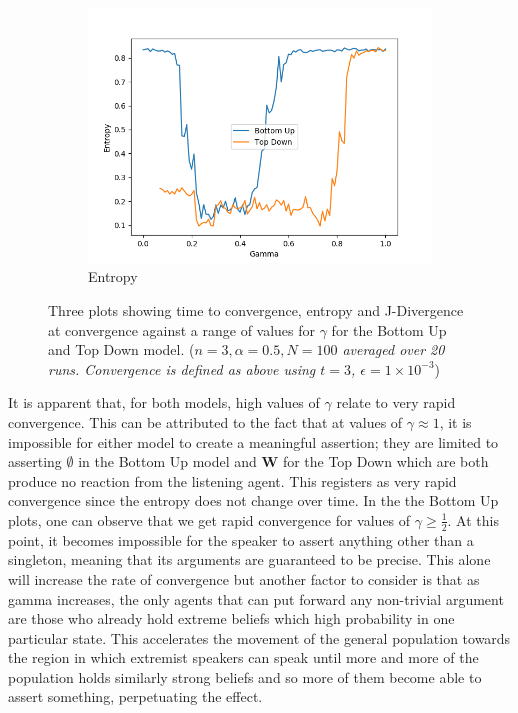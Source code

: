 \begin{figure}[H]
\begin{subfigure}[ht]{0.45\textwidth}
    \includegraphics[width=\textwidth]{Images/Figures/All/Entropy_ALL_n_3_p_100_gamma_100_runs_20.png}
    \caption{Entropy}
 \end{subfigure}
 \caption{Three plots showing time to convergence, entropy and J-Divergence at convergence against a range of values for $\gamma$ for the Bottom Up and Top Down model. (\textit{$n=3, \alpha = 0.5, N = 100$ averaged over 20 runs. Convergence is defined as above using $t=3$, $\epsilon = 1 \times10^{-3}$})}\label{fig:convergence_none}
\end{figure}

It is apparent that, for both models, high values of $\gamma$ relate to very rapid convergence. This can be attributed to the fact that at values of $\gamma \approx 1$, it is impossible for either model to create a meaningful assertion; they are limited to asserting $\emptyset$ in the Bottom Up model and $\mathbf{W}$ for the Top Down which are both produce no reaction from the listening agent. This registers as very rapid convergence since the entropy does not change over time. 
In the the Bottom Up plots, one can observe that we get rapid convergence for values of $\gamma \geq \frac{1}{2}$. At this point, it becomes impossible for the speaker to assert anything other than a singleton, meaning that its arguments are guaranteed to be precise. This alone will increase the rate of convergence but another factor to consider is that as gamma increases, the only agents that can put forward any non-trivial argument are those who already hold extreme beliefs which high probability in one particular state. This accelerates the movement of the general population towards the region in which extremist speakers can speak until more and more of the population holds similarly strong beliefs and so more of them become able to assert something, perpetuating the effect. 

